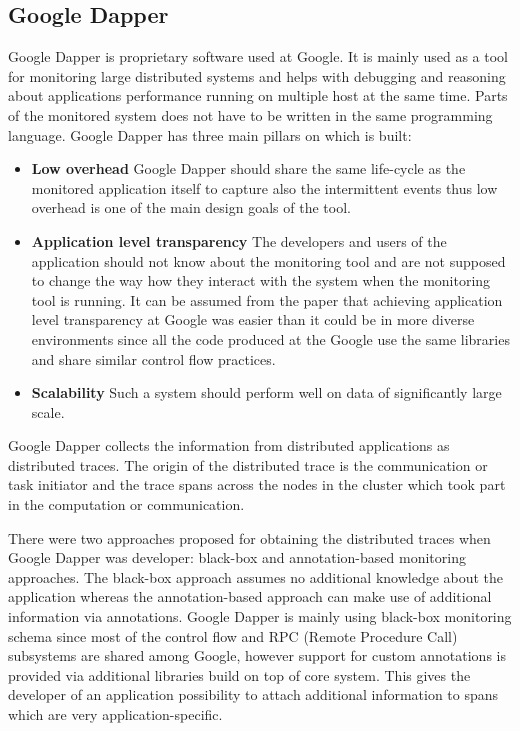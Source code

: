 \subsection{Google Dapper}
\label{dapper}
Google Dapper is proprietary software used at Google. It is mainly used as a tool for monitoring large distributed systems and helps with debugging and reasoning about applications performance running on multiple host at the same time. Parts of the monitored system does not have to be written in the same programming language. Google Dapper has three main pillars on which is built:
\begin{itemize}
	\item \textbf{Low overhead} \newline
	Google Dapper should share the same life-cycle as the monitored application itself to capture also the intermittent events thus low overhead is one of the main design goals of the tool.
	\item \textbf{Application level transparency} \newline
	The developers and users of the application should not know about the monitoring tool and are not supposed to change the way how they interact with the system when the monitoring tool is running. It can be assumed from the paper that achieving application level transparency at Google was easier than it could be in more diverse environments since all the code produced at the Google use the same libraries and share similar control flow practices.
	\item \textbf{Scalability} \newline
	Such a system should perform well on data of significantly large scale.
\end{itemize}	
Google Dapper collects the information from distributed applications as distributed traces. The origin of the distributed trace is the communication or task initiator and the trace spans across the nodes in the cluster which took part in the computation or communication.
	
There were two approaches proposed for obtaining the distributed traces when Google Dapper was developer: black-box and annotation-based monitoring approaches. The black-box approach assumes no additional knowledge about the application whereas the annotation-based approach can make use of additional information via annotations. Google Dapper is mainly using black-box monitoring schema since most of the control flow and RPC (Remote Procedure Call) subsystems are shared among Google, however support for custom annotations is provided via additional libraries build on top of core system. This gives the developer of an application possibility to attach additional information to spans which are very application-specific.
	
